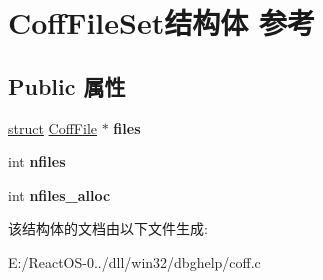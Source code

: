 \hypertarget{struct_coff_file_set}{}\section{Coff\+File\+Set结构体 参考}
\label{struct_coff_file_set}
\subsection*{Public 属性}
\begin{DoxyCompactItemize}
\item 
\mbox{\label{struct_coff_file_set_a66c0f597e9ed253ab17ff36c61f1707a}} 
\hyperlink{interfacestruct}{struct} \hyperlink{struct_coff_file}{Coff\+File} $\ast$ {\bfseries files}
\item 
\mbox{\label{struct_coff_file_set_abae5a26ba214121c0b704e6618269630}} 
int {\bfseries nfiles}
\item 
\mbox{\label{struct_coff_file_set_afd27f904534255288df4cd62a466c77a}} 
int {\bfseries nfiles\+\_\+alloc}
\end{DoxyCompactItemize}


该结构体的文档由以下文件生成\+:\begin{DoxyCompactItemize}
\item 
E\+:/\+React\+O\+S-\/0../dll/win32/dbghelp/coff.\+c\end{DoxyCompactItemize}
